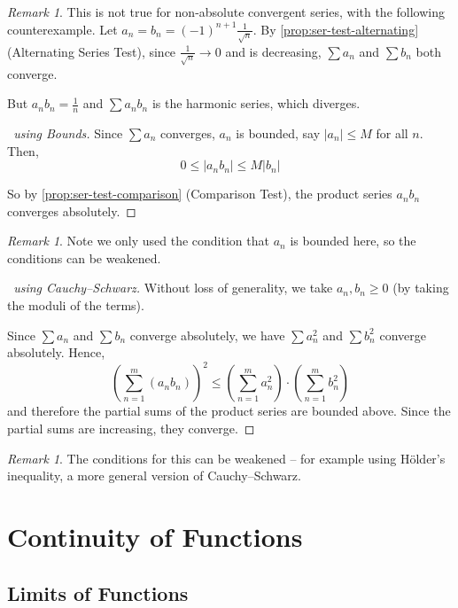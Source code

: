 \documentclass[11pt]{article}
\numberwithin{equation}{section}
\theoremstyle{definition}
\theoremstyle{remark}
\newtheorem{remark}[theorem]{Remark}
\newcommand{\pqty}[1]{\left(#1\right)}
\newcommand{\abs}[1]{\left|#1\right|}
\begin{document}
\begin{remark}\label{analysis-unit-0065}
    This is not true for non-absolute convergent series, with the following counterexample. Let \(a_n = b_n = \pqty{-1}^{n + 1} \frac{1}{\sqrt{n}}\). By \autoref{prop:ser-test-alternating} (Alternating Series Test), since \(\frac{1}{\sqrt{n}} \to 0\) and is decreasing, \(\sum a_n\) and \(\sum b_n\) both converge.

    But \(a_n b_n = \frac{1}{n}\) and \(\sum a_n b_n\) is the harmonic series, which diverges.
\end{remark}

\begin{proof}[\proofname\ using Bounds]
    Since \(\sum a_n\) converges, \(a_n\) is bounded, say \(|a_n|\le M\) for all \(n\). Then,
    \[
            0 \leq \abs{a_n b_n} \leq M \abs{b_n}
    \]

    So by \autoref{prop:ser-test-comparison} (Comparison Test), the product series \(a_n b_n\) converges absolutely.
\end{proof}

\begin{remark}\label{analysis-unit-0066}
    Note we only used the condition that \(a_n\) is bounded here, so the conditions can be weakened.
\end{remark}

\begin{proof}[\proofname\ using Cauchy--Schwarz]
    Without loss of generality, we take \(a_n, b_n \geq 0\) (by taking the moduli of the terms).

    Since \(\sum a_n\) and \(\sum b_n\) converge absolutely, we have \(\sum a_n^2\) and \(\sum b_n^2\) converge absolutely. Hence,
    \[
        \pqty{\sum_{n = 1}^{m} \pqty{a_n b_n}}^2 \leq \pqty{\sum_{n = 1}^{m} a_n^2} \cdot \pqty{\sum_{n = 1}^{m} b_n^2}
    \]
    and therefore the partial sums of the product series are bounded above. Since the partial sums are increasing, they converge.
\end{proof}
\begin{remark}\label{analysis-unit-0067}
    The conditions for this can be weakened -- for example using H\"older's inequality, a more general version of Cauchy--Schwarz.
\end{remark}

\section{Continuity of Functions}
\subsection{Limits of Functions}
\end{document}
